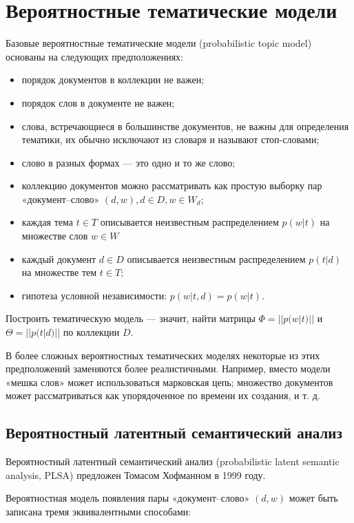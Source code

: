 \documentclass[a4paper,12pt,preview]{report} %
\begin{document}
	\section{Вероятностные тематические модели}
	
	Базовые вероятностные тематические модели \cite{22} (probabilistic topic model) основаны на следующих предположениях:
	
	\begin{itemize}
		\item порядок документов в коллекции не важен;
		\item порядок слов в документе не важен;
		\item слова, встречающиеся в большинстве документов, не важны для определения тематики, их обычно исключают из словаря и называют стоп-словами;
		\item слово в разных формах — это одно и то же слово;
		\item коллекцию документов можно рассматривать как простую выборку пар «документ–слово» $(d, w), d \in D, w \in W_d$;
		\item каждая тема $t \in T$ описывается неизвестным распределением $p(w | t)$ на множестве слов $w \in W$
		\item каждый документ $d \in D$ описывается неизвестным распределением $p(t|d)$ на множестве тем $t \in T$;
		\item гипотеза условной независимости: $p(w|t,d)=p(w|t)$.
	\end{itemize}
	
	Построить тематическую модель — значит, найти матрицы $\Phi = ||p(w|t)||$ и $\Theta = ||p(t|d)||$ по коллекции $D$.
	
	В более сложных вероятностных тематических моделях некоторые из этих предположений заменяются более реалистичными. Например, вместо модели «мешка слов» может использоваться марковская цепь; множество документов может рассматриваться как упорядоченное по времени их создания, и т. д.
	
	
	\subsection{Вероятностный латентный семантический анализ}
	
	Вероятностный латентный семантический анализ (probabilistic latent semantic analysis, PLSA) предложен Томасом Хофманном в 1999 году.
	
	Вероятностная модель появления пары «документ–слово» $(d,w)$ может быть записана тремя эквивалентными способами:
	
\end{document}
